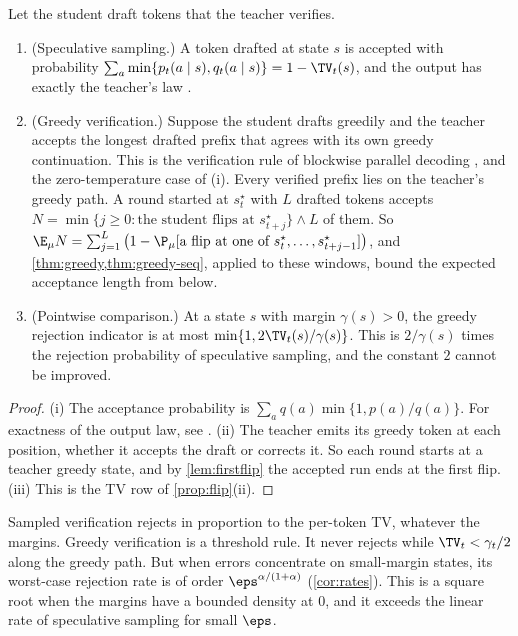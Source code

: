 \begin{proposition}\label{prop:spec}
\Pv\Ck Let the student draft tokens that the teacher verifies.
\begin{enumerate}[label=(\roman*),nosep]
\item (Speculative sampling.) A token drafted at state $s$ is accepted with probability
$\sum_a\min\{p_t(a\mid s),q_t(a\mid s)\}=1-\TV_t(s)$, and the output has exactly the teacher's law
\citep{leviathan2023fast}.
\item (Greedy verification.) Suppose the student drafts greedily and the teacher accepts the longest drafted
prefix that agrees with its own greedy continuation. This is the verification rule of blockwise parallel
decoding \citep{stern2018blockwise}, and the zero-temperature case of (i). Every verified prefix lies on the
teacher's greedy path. A round started at $s^\star_t$ with $L$ drafted tokens accepts
$N=\min\{j\ge0:\text{the student flips at }s^\star_{t+j}\}\wedge L$ of them. So
$\E_\mu N=\sum_{j=1}^L\big(1-\P_\mu[\text{a flip at one of }s^\star_t,\dots,s^\star_{t+j-1}]\big)$, and
\cref{thm:greedy,thm:greedy-seq}, applied to these windows, bound the expected acceptance length from below.
\item (Pointwise comparison.) At a state $s$ with margin $\gamma(s)>0$, the greedy rejection indicator is at most
$\min\{1,2\TV_t(s)/\gamma(s)\}$. This is $2/\gamma(s)$ times the rejection probability of speculative
sampling, and the constant $2$ cannot be improved.
\end{enumerate}
\end{proposition}
\begin{proof}
(i) The acceptance probability is $\sum_aq(a)\min\{1,p(a)/q(a)\}$. For exactness of the output law, see
\citet{leviathan2023fast}. (ii) The teacher emits its greedy token at each position, whether it accepts the
draft or corrects it. So each round starts at a teacher greedy state, and by \cref{lem:firstflip} the
accepted run ends at the first flip. (iii) This is the TV row of \cref{prop:flip}(ii).
\end{proof}

\noindent
Sampled verification rejects in proportion to the per-token TV, whatever the margins. Greedy verification
is a threshold rule. It never rejects while $\TV_t<\gamma_t/2$ along the greedy path. But when errors concentrate on
small-margin states, its worst-case rejection rate is of order $\eps^{\alpha/(1+\alpha)}$ (\cref{cor:rates}). This is a square
root when the margins have a bounded density at $0$, and it exceeds the linear rate of speculative sampling
for small $\eps$.

